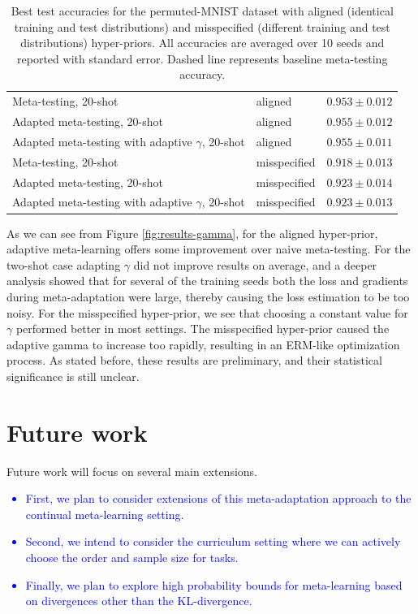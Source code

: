\documentclass{article}
\theoremstyle{definition}
\newcommand{\LFe}[1]{\textcolor{blue}{#1}}
\begin{document}
\begin{table}
\begin{tabular}{lll}
		Meta-testing, 20-shot & aligned   & $0.953\pm 0.012 $      \\
		Adapted meta-testing, 20-shot & aligned   & $0.955\pm 0.012$      \\
		Adapted meta-testing with adaptive $\gamma$, 20-shot & aligned   & $0.955\pm 0.011$      \\
		\midrule
		Meta-testing, 20-shot & misspecified   & $0.918\pm 0.013 $      \\
		Adapted meta-testing, 20-shot & misspecified   & $0.923\pm 0.014$      \\
		Adapted meta-testing with adaptive $\gamma$, 20-shot & misspecified   & $0.923\pm 0.013$    \\
		\midrule
		\bottomrule
	\end{tabular}
	\caption{Best test accuracies for the permuted-MNIST dataset with aligned (identical training and test distributions) and misspecified (different training and test distributions) hyper-priors. All accuracies are averaged over 10 seeds and reported with standard error. Dashed line represents baseline meta-testing accuracy.}
	\label{table:gamma}
\end{table}


As we can see from Figure \ref{fig:results-gamma}, for the aligned hyper-prior, adaptive meta-learning offers some improvement over naive meta-testing. For the two-shot case adapting $\gamma$ did not improve results on average, and a deeper analysis showed that for several of the training seeds both the loss and gradients during meta-adaptation were large, thereby causing the loss estimation to be too noisy. 
For the misspecified hyper-prior, we see that choosing a constant value for $\gamma$ performed better in most settings. The misspecified hyper-prior caused the adaptive gamma to increase too rapidly, resulting in an ERM-like optimization process.
As stated before, these results are preliminary, and their statistical significance is still unclear.

\section{Future work}

Future work will focus on several main extensions. \LFe{
\begin{itemize}
	\item First, we plan to consider extensions of this meta-adaptation approach to the continual meta-learning setting.
	\item Second, we intend to consider the curriculum setting where we can actively choose the order and sample size for tasks.
	\item Finally, we plan to explore high probability bounds for meta-learning based on divergences other than the KL-divergence.
\end{itemize}}  
\end{document}
